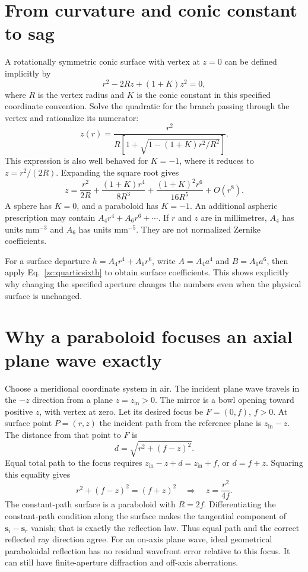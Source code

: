 \section{From curvature and conic constant to sag}
A rotationally symmetric conic surface with vertex at $z=0$ can be
defined implicitly by
\begin{equation}
 r^2-2Rz+(1+K)z^2=0,
 \label{zc:conicimplicit}
\end{equation}
where $R$ is the vertex radius and $K$ is the conic constant in this
specified coordinate convention. Solve the quadratic for the branch
passing through the vertex and rationalize its numerator:
\begin{equation}
 z(r)=\frac{r^2}{R\left[1+\sqrt{1-(1+K)r^2/R^2}\right]}.
 \label{zc:conicsag}
\end{equation}
This expression is also well behaved for $K=-1$, where it reduces to
$z=r^2/(2R)$. Expanding the square root gives
\begin{equation}
 z=\frac{r^2}{2R}+\frac{(1+K)r^4}{8R^3}
                +\frac{(1+K)^2r^6}{16R^5}+O(r^8).
 \label{zc:conicseries}
\end{equation}
A sphere has $K=0$, and a paraboloid has $K=-1$. An additional aspheric
prescription may contain $A_4r^4+A_6r^6+\cdots$. If $r$ and $z$ are in
millimetres, $A_4$ has units $\mathrm{mm}^{-3}$ and $A_6$ has units
$\mathrm{mm}^{-5}$. They are not normalized Zernike coefficients.

For a surface departure $h=A_4r^4+A_6r^6$, write
$A=A_4a^4$ and $B=A_6a^6$, then apply
Eq.~\eqref{zc:quarticsixth} to obtain surface coefficients. This shows
explicitly why changing the specified aperture changes the numbers even
when the physical surface is unchanged.

\section{Why a paraboloid focuses an axial plane wave exactly}
Choose a meridional coordinate system in air. The incident plane wave
travels in the $-z$ direction from a plane $z=z_{\mathrm{in}}>0$.
The mirror is a bowl opening toward positive $z$, with vertex at zero.
Let its desired focus be $F=(0,f)$, $f>0$. At surface point
$P=(r,z)$ the incident path from the reference plane is
$z_{\mathrm{in}}-z$. The distance from that point to $F$ is
\begin{equation}
 d=\sqrt{r^2+(f-z)^2}.
\end{equation}
Equal total path to the focus requires
$z_{\mathrm{in}}-z+d=z_{\mathrm{in}}+f$, or $d=f+z$.
Squaring this equality gives
\begin{equation}
 r^2+(f-z)^2=(f+z)^2
 \quad\Longrightarrow\quad z=\frac{r^2}{4f}.
\end{equation}
The constant-path surface is a paraboloid with $R=2f$. Differentiating
the constant-path condition along the surface makes the tangential
component of $\bm s_i-\bm s_r$ vanish; that is exactly the reflection
law. Thus equal path and the correct reflected ray direction agree.
For an on-axis plane wave, ideal geometrical paraboloidal reflection
has no residual wavefront error relative to this focus. It can still
have finite-aperture diffraction and off-axis aberrations.

